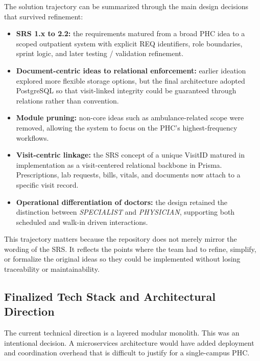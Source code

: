 \documentclass[conference]{IEEEtran}
\begin{document}
The solution trajectory can be summarized through the main design decisions that survived refinement:
\begin{itemize}
    \item \textbf{SRS 1.x to 2.2:} the requirements matured from a broad PHC idea to a scoped outpatient system with explicit REQ identifiers, role boundaries, sprint logic, and later testing / validation refinement.
    \item \textbf{Document-centric ideas to relational enforcement:} earlier ideation explored more flexible storage options, but the final architecture adopted PostgreSQL so that visit-linked integrity could be guaranteed through relations rather than convention.
    \item \textbf{Module pruning:} non-core ideas such as ambulance-related scope were removed, allowing the system to focus on the PHC's highest-frequency workflows.
    \item \textbf{Visit-centric linkage:} the SRS concept of a unique VisitID matured in implementation as a visit-centered relational backbone in Prisma. Prescriptions, lab requests, bills, vitals, and documents now attach to a specific visit record.
    \item \textbf{Operational differentiation of doctors:} the design retained the distinction between \textit{SPECIALIST} and \textit{PHYSICIAN}, supporting both scheduled and walk-in driven interactions.
\end{itemize}

This trajectory matters because the repository does not merely mirror the wording of the SRS. It reflects the points where the team had to refine, simplify, or formalize the original ideas so they could be implemented without losing traceability or maintainability.

\subsection{Finalized Tech Stack and Architectural Direction}
The current technical direction is a layered modular monolith. This was an intentional decision. A microservices architecture would have added deployment and coordination overhead that is difficult to justify for a single-campus PHC.
\end{document}
